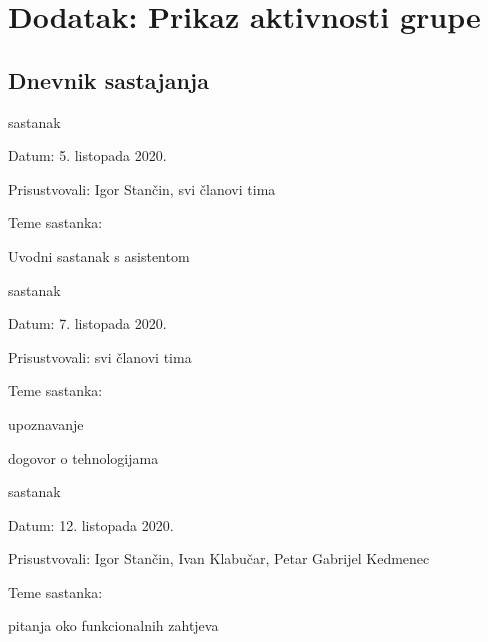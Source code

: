 %

\chapter*{Dodatak: Prikaz aktivnosti grupe}
		
		\section*{Dnevnik sastajanja}
		
		\begin{packed_enum}
			\item  sastanak
			
			\item[] \begin{packed_item}
				\item Datum: 5. listopada 2020. 
				\item Prisustvovali:  Igor Stančin, svi članovi tima
				\item Teme sastanka:
				\begin{packed_item}
					\item  Uvodni sastanak s asistentom
				\end{packed_item}
			\end{packed_item}
			
			\item  sastanak
			\item[] \begin{packed_item}
				\item Datum: 7. listopada 2020. 
				\item Prisustvovali: svi članovi tima
				\item Teme sastanka:
				\begin{packed_item}
					\item  upoznavanje
					\item  dogovor o tehnologijama
				\end{packed_item}
			\end{packed_item}
			
			\item  sastanak
			\item[] \begin{packed_item}
				\item Datum: 12. listopada 2020. 
				\item Prisustvovali: Igor Stančin, Ivan Klabučar, Petar Gabrijel Kedmenec
				\item Teme sastanka:
				\begin{packed_item}
					\item  pitanja oko funkcionalnih zahtjeva
				\end{packed_item}
			\end{packed_item}
			

\end{packed_enum}

